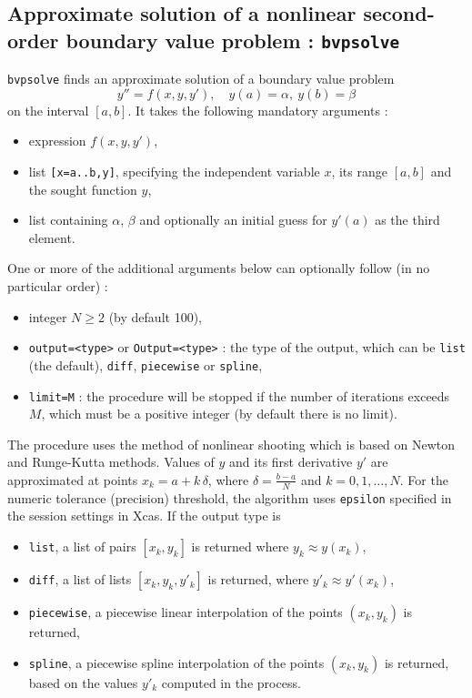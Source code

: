 \documentclass[a4paper,11pt]{book}
\begin{document}
\subsection{Approximate solution of a nonlinear second-order boundary value problem : {\tt bvpsolve} }
{\tt bvpsolve} finds an approximate solution of a boundary value problem
\[ y''=f(x,y,y'),\quad y(a)=\alpha,\ y(b)=\beta \]
on the interval $[a,b]$. It takes the following mandatory arguments :
\begin{itemize}
  \item expression $f(x,y,y')$,
  \item list {\tt [x=a..b,y]}, specifying the independent variable $x$, its range $[a,b]$ and the sought function $y$,
  \item list containing $\alpha$, $\beta$ and optionally an initial guess for $y'(a)$ as the third element.
\end{itemize}
One or more of the additional arguments below can optionally follow (in no particular order) :
\begin{itemize}
  \item integer $N\geq 2$ (by default 100),
  \item {\tt output=<type>} or {\tt Output=<type>} : the type of the output, which can be {\tt list} (the default), {\tt diff}, {\tt piecewise} or {\tt spline},
  \item {\tt limit=M} : the procedure will be stopped if the number of iterations exceeds $M$, which must be a positive integer (by default there is no limit).
\end{itemize}

The procedure uses the method of nonlinear shooting which is based on Newton and Runge-Kutta methods. Values of $y$ and its first derivative $y'$ are approximated at points $x_k=a+k\,\delta$, where $\delta=\frac{b-a}{N}$ and $k=0,1,\dots,N$. For the numeric tolerance (precision) threshold, the algorithm uses {\tt epsilon} specified in the session settings in Xcas. If the output type is
\begin{itemize}
  \item {\tt list}, a list of pairs $[x_k,y_k]$ is returned where $y_k\approx y(x_k)$,
  \item {\tt diff}, a list of lists $[x_k,y_k,y'_k]$ is returned, where $y'_k\approx y'(x_k)$,
  \item {\tt piecewise}, a piecewise linear interpolation of the points $(x_k,y_k)$ is returned,
  \item {\tt spline}, a piecewise spline interpolation of the points $(x_k,y_k)$ is returned, based on the values $y'_k$ computed in the process.
\end{itemize}
\end{document}
